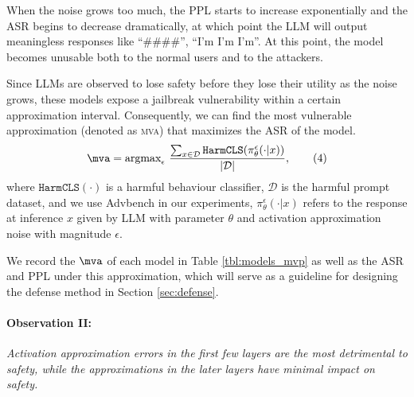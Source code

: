 
When the noise grows too much, the PPL starts to increase exponentially and the ASR begins to decrease dramatically, at which point the LLM will output meaningless responses like ``\#\#\#\#'', ``I'm I'm I'm''. At this point, the model becomes unusable both to the normal users and to the attackers.

Since LLMs are observed to lose safety before they lose their utility as the noise grows, these models expose a jailbreak vulnerability within a certain approximation interval. Consequently, we can find the most vulnerable approximation (denoted as \textsc{mva}) that maximizes the ASR of the model.
\begin{gather*}
    \mva = \text{argmax}_\epsilon~ \frac{\sum_{x \in \mathcal{D}} \texttt{HarmCLS}(\pi^{\epsilon}_\theta(\cdot|x)) }{|\mathcal{D}|}, \tag{4} 
\end{gather*}
where $\texttt{HarmCLS}(\cdot)$ is a harmful behaviour classifier, $\mathcal{D}$ is the harmful prompt dataset, and we use Advbench \cite{zou2023universal} in our experiments, $\pi^{\epsilon}_\theta(\cdot|x)$ refers to the response at inference $x$ given by LLM with parameter $\theta$ and activation approximation noise with magnitude $\epsilon$.

We record the $\mva$ of each model in Table \ref{tbl:models_mvp} as well as the ASR and PPL under this approximation, which will serve as a guideline for designing the defense method in Section \ref{sec:defense}.


\paragraph{Observation II:} \textit{Activation approximation errors in the first few layers are the most detrimental to safety, while the approximations in the later layers have minimal impact on safety.}

